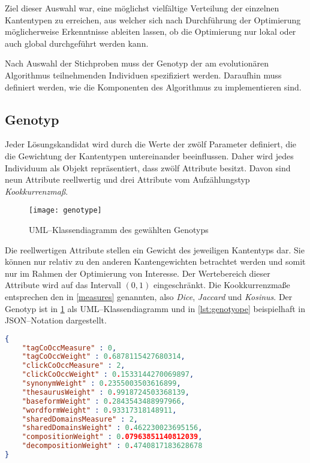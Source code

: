 Ziel dieser Auswahl war, eine möglichst vielfältige Verteilung der einzelnen Kantentypen zu erreichen, aus welcher sich nach Durchführung der Optimierung möglicherweise Erkenntnisse ableiten lassen, ob die Optimierung nur lokal oder auch global durchgeführt werden kann.

Nach Auswahl der Stichproben muss der Genotyp der am evolutionären Algorithmus teilnehmenden Individuen spezifiziert werden. Daraufhin muss definiert werden, wie die Komponenten des Algorithmus zu implementieren sind.

\subsection{Genotyp}

Jeder Lösungskandidat wird durch die Werte der zwölf Parameter definiert, die die Gewichtung der Kantentypen untereinander beeinflussen. Daher wird jedes Individuum als Objekt repräsentiert, dass zwölf Attribute besitzt. Davon sind neun Attribute reellwertig und drei Attribute vom Aufzählungstyp \emph{Kookkurrenzmaß}.

\begin{figure}
\centering
\texttt{[image: genotype]}
\caption{UML--Klassendiagramm des gewählten Genotyps}
\label{fig:genotype}
\end{figure}

Die reellwertigen Attribute stellen ein Gewicht des jeweiligen Kantentyps dar. Sie können nur relativ zu den anderen Kantengewichten betrachtet werden und somit nur im Rahmen der Optimierung von Interesse. Der Wertebereich dieser Attribute wird auf das Intervall \((0,1)\) eingeschränkt. Die Kookkurrenzmaße entsprechen den in \cref{measures} genannten, also \emph{Dice}, \emph{Jaccard} und \emph{Kosinus}. Der Genotyp ist in \cref{fig:genotype} als UML--Klassendiagramm und in \cref{lst:genotyope} beispielhaft in JSON--Notation dargestellt.

\begin{lstlisting}[language=json, label={lst:genotyope}, caption={Beispiel für ein Individuum}]
{
    "tagCoOccMeasure" : 0,
    "tagCoOccWeight" : 0.6878115427680314,
    "clickCoOccMeasure" : 2,
    "clickCoOccWeight" : 0.1533144270069897,
    "synonymWeight" : 0.2355003503616899,
    "thesaurusWeight" : 0.9918724503368139,
    "baseformWeight" : 0.2843543488997966,
    "wordformWeight" : 0.93317318148911,
    "sharedDomainsMeasure" : 2,
    "sharedDomainsWeight" : 0.462230023695156,
    "compositionWeight" : 0.07963851140812039,
    "decompositionWeight" : 0.4740817183628678
}
\end{lstlisting}

